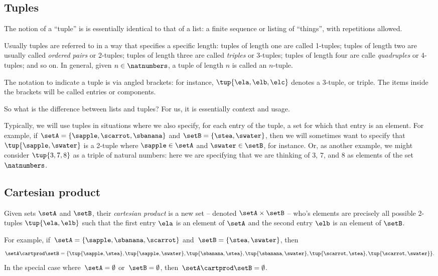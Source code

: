 \subsection{Tuples}

The notion of a ``tuple'' is is essentially identical to that of a list: a finite sequence or listing of ``things'', with repetitions allowed. 

Usually tuples are referred to in a way that specifies a specific length: tuples of length one are called 1-tuples; tuples of length two are usually called \emph{ordered pairs} or 2-tuples; tuples of length three are called \emph{triples} or $3$-tuples; tuples of length four are calle \emph{quadruples} or 4-tuples; and so on. In general, given $n \in \natnumbers$, a tuple of length $n$ is called an $n$-tuple. 

The notation to indicate a tuple is via angled brackets: for instance, $\tup{\ela, \elb, \elc}$ denotes a 3-tuple, or triple. The items inside the brackets will be called entries or components. 

So what is the difference between lists and tuples? For us, it is essentially context and usage. 

Typically, we will use tuples in situations where we also specify, for each entry of the tuple, a set for which that entry is an element. For example, if $\setA = \{ \sapple, \scarrot, \sbanana \}$ and $\setB = \{ \stea, \swater \}$, then we will sometimes want to specify that $\tup{\sapple, \swater}$ is a 2-tuple where $\sapple \in \setA$ and $\swater \in \setB$, for instance. Or, as another example, we might consider $\tup{3, 7, 8}$ as a triple of natural numbers: here we are specifying that we are thinking of $3$, $7$, and $8$ as elements of the set $\natnumbers$. 

\subsection{Cartesian product}\label{sec:cartesian-product}

Given sets $\setA$ and $\setB$, their \emph{cartesian product} is a new set -- denoted $\setA \times \setB$ -- who's elements are precisely all possible 2-tuples $\tup{\ela, \elb}$ such that the first entry $\ela$ is an element of $\setA$ and the second entry $\elb$ is an element of $\setB$. 

For example, if~$\setA = \{ \sapple, \sbanana, \scarrot\}$ and~$\setB = \{ \stea, \swater \}$, then
\begin{equation*}
    \setA \cartprod \setB = \{ \tup{\sapple, \stea}, \tup{\sapple, \swater}, \tup{\sbanana, \stea}, \tup{\sbanana, \swater},  \tup{\scarrot, \stea}, \tup{\scarrot, \swater}\}.
\end{equation*}
In the special case where~$\setA = \emptyset$ or~$\setB = \emptyset$, then~$\setA \cartprod \setB = \emptyset$.


